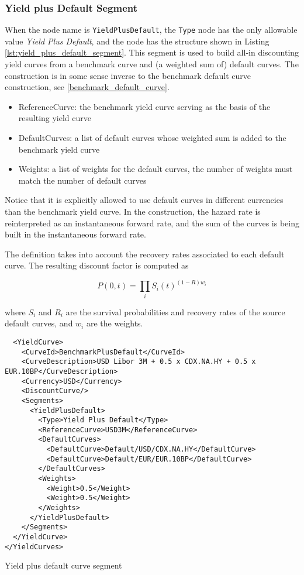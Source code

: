 \subsubsection*{Yield plus Default Segment}
\label{sec:yield_plus_default}

When the node name is \lstinline!YieldPlusDefault!, the \lstinline!Type! node has the only allowable value \emph{Yield
 Plus Default}, and the node has the structure shown in Listing \ref{lst:yield_plus_default_segment}. This segment is
used to build all-in discounting yield curves from a benchmark curve and (a weighted sum of) default curves. The
construction is in some sense inverse to the benchmark default curve construction, see \ref{benchmark_default_curve}.

\begin{itemize}
\item ReferenceCurve: the benchmark yield curve serving as the basis of the resulting yield curve
\item DefaultCurves: a list of default curves whose weighted sum is added to the benchmark yield curve
\item Weights: a list of weights for the default curves, the number of weights must match the number of default curves
\end{itemize}

Notice that it is explicitly allowed to use default curves in different currencies than the benchmark yield curve. In
the construction, the hazard rate is reinterpreted as an instantaneous forward rate, and the sum of the curves is being
built in the instantaneous forward rate.

The definition takes into account the recovery rates associated to each default curve. The resulting discount factor is
computed as

\begin{equation}
P(0,t) = \prod_i  S_i(t)^{(1-R)w_i}
\end{equation}

where $S_i$ and $R_i$ are the survival probabilities and recovery rates of the source default curves, and $w_i$ are the
weights.

\begin{listing}[H]
\begin{verbatim}
  <YieldCurve>
    <CurveId>BenchmarkPlusDefault</CurveId>
    <CurveDescription>USD Libor 3M + 0.5 x CDX.NA.HY + 0.5 x EUR.10BP</CurveDescription>
    <Currency>USD</Currency>
    <DiscountCurve/>
    <Segments>
      <YieldPlusDefault>
        <Type>Yield Plus Default</Type>
        <ReferenceCurve>USD3M</ReferenceCurve>
        <DefaultCurves>
          <DefaultCurve>Default/USD/CDX.NA.HY</DefaultCurve>
          <DefaultCurve>Default/EUR/EUR.10BP</DefaultCurve>
        </DefaultCurves>
        <Weights>
          <Weight>0.5</Weight>
          <Weight>0.5</Weight>
        </Weights>
      </YieldPlusDefault>
    </Segments>
  </YieldCurve>
</YieldCurves>
\end{verbatim}
\caption{Yield plus default curve segment}
\label{lst:yield_plus_default_segment}
\end{listing}

